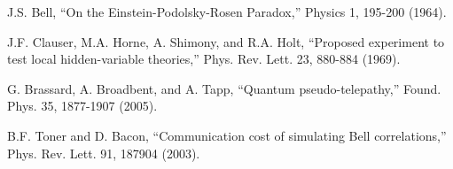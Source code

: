 \documentclass[11pt,a4paper]{article}
\begin{document}
\begin{thebibliography}{9}
J.S. Bell, ``On the Einstein-Podolsky-Rosen Paradox,'' Physics 1, 195-200 (1964).

J.F. Clauser, M.A. Horne, A. Shimony, and R.A. Holt, ``Proposed experiment to test local hidden-variable theories,'' Phys. Rev. Lett. 23, 880-884 (1969).

G. Brassard, A. Broadbent, and A. Tapp, ``Quantum pseudo-telepathy,'' Found. Phys. 35, 1877-1907 (2005).

B.F. Toner and D. Bacon, ``Communication cost of simulating Bell correlations,'' Phys. Rev. Lett. 91, 187904 (2003).
\end{thebibliography}
\end{document}
